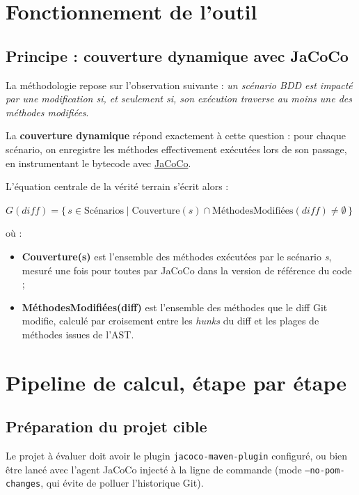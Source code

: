 \documentclass[12pt,a4paper]{article}
\begin{document}
\section{Fonctionnement de l'outil}

\subsection{Principe : couverture dynamique avec JaCoCo}
\label{sec:principe}

La méthodologie repose sur l'observation suivante : \emph{un scénario BDD est impacté par une modification si, et seulement si, son exécution traverse au moins une des méthodes modifiées}.

La \textbf{couverture dynamique} répond exactement à cette question : pour chaque scénario, on enregistre les méthodes effectivement exécutées lors de son passage, en instrumentant le bytecode avec \href{https://www.jacoco.org/}{JaCoCo}.

L'équation centrale de la vérité terrain s'écrit alors :

\begin{formulabox}
$G(\mathit{diff}) = \{\, s \in \text{Scénarios} \mid \text{Couverture}(s) \cap \text{MéthodesModifiées}(\mathit{diff}) \neq \emptyset \,\}$
\end{formulabox}

\noindent où :
\begin{itemize}
  \item \textbf{Couverture(s)} est l'ensemble des méthodes exécutées par le scénario \emph{s}, mesuré une fois pour toutes par JaCoCo dans la version de référence du code ;
  \item \textbf{MéthodesModifiées(diff)} est l'ensemble des méthodes que le diff Git modifie, calculé par croisement entre les \emph{hunks} du diff et les plages de méthodes issues de l'AST.
\end{itemize}


\section{Pipeline de calcul, étape par étape}
\label{sec:pipeline}

\subsection{Préparation du projet cible}

Le projet à évaluer doit avoir le plugin \texttt{jacoco-maven-plugin} configuré, ou bien être lancé avec l'agent JaCoCo injecté à la ligne de commande (mode \texttt{--no-pom-changes}, qui évite de polluer l'historique Git).
\end{document}
